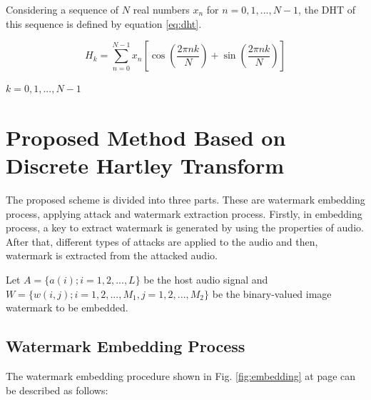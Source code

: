 \documentclass[12pt,a4paper]{report}
\begin{document}
\newpage

Considering a sequence of $N$ real numbers $ x_{n} $ for $ n = 0, 1, ..., N-1 $, the DHT of this sequence is defined by equation \ref{eq:dht}.

\begin{equation} \label{eq:dht}
H_{k} = \sum_{n=0}^{N-1} x_{n}[\cos(\frac{2\pi nk}{N}) + \sin(\frac{2\pi nk}{N})]
\end{equation} 

\begin{center}
$ k = 0, 1, ..., N-1 $
\end{center}


\section{Proposed Method Based on Discrete Hartley Transform}

The proposed scheme is divided into three parts. These are watermark embedding process, applying attack and watermark extraction process. Firstly, in embedding process, a key to extract watermark is generated by using the properties of audio. After that, different types of attacks are applied to the audio and then, watermark is extracted from the attacked audio.

\bigskip

Let $ A = \lbrace a(i); i = 1,2,...,L\rbrace $ be the host audio signal and $ W = \{w(i,j); i=1,2,...,M_{1}, j=1,2,...,M_{2}\} $ be the binary-valued image watermark to be embedded.

\subsection{Watermark Embedding Process}

The watermark embedding procedure shown in Fig. \ref{fig:embedding} at page \pageref{fig:embedding} can be described as follows:
\end{document}
